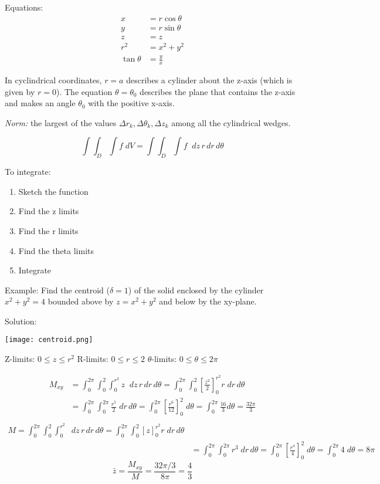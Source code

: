 \documentclass[12pt]{article}
\begin{document}
Equations:
\begin{align*}
    x &= r\cos\theta\\
    y&= r\sin \theta\\
    z &= z\\
    r^2 &= x^2 + y^2\\
    \tan \theta &= \frac{y}{x}
\end{align*}

In cyclindrical coordinates, $r=a$ describes a cylinder about the z-axis (which is given by $r=0$). The equation $\theta = \theta_0$ describes the plane that contains the z-axis and makes an angle $\theta_0$ with the positive x-axis. 

\emph{Norm:} the largest of the values $\Delta r_k, \Delta \theta_k, \Delta z_k$ among all the cylindrical wedges.

\[\int \int_D \int f \; dV = \int \int_D \int f \; \; dz \, r \, dr\, d\theta \]

To integrate:
\begin{enumerate}
    \item Sketch the function
    \item Find the z limits
    \item Find the r limits
    \item Find the theta limits
    \item Integrate
\end{enumerate}

Example: Find the centroid ($\delta = 1$) of the solid enclosed by the cylinder $x^2 + y^2 = 4$ bounded above by $z= x^2 + y^2$ and below by the xy-plane. 

Solution: 
\begin{center}
    \texttt{[image: centroid.png]}
\end{center}

Z-limits: $0 \leq z \leq r^2$
R-limits: $0 \leq r \leq 2$
$\theta$-limits: $0 \leq \theta \leq 2\pi$

\begin{align*}
    M_{xy} &= \int_0^{2\pi} \int_0^2 \int_0^{r^2} z \; \; dz \, r \, dr \, d\theta = \int_0^{2\pi} \int_0^2 \left[\frac{z^2}{2}\right]_0^{r^2} r \; dr \, d\theta\\
    &= \int_0^{2\pi} \int_0^{2\pi} \frac{r^5}{2} \; dr \, d\theta = \int_0^{2\pi} \left[\frac{r^6}{12}\right]_0^2 \; d\theta = \int_0^{2\pi} \frac{16}{3} d\theta = \frac{32\pi}{3}\\
\end{align*}
\begin{align*}
    M = \int_0^{2\pi} \int_0^2 \int_0^{r^2} \; \; dz \, r \, dr \, d\theta = \int_0^{2\pi} \int_0^2 \left[z\right]_0^{r^2} r \; dr \, d\theta\\
    &= \int_0^{2\pi} \int_0^{2\pi} r^3 \; dr \, d\theta = \int_0^{2\pi} \left[\frac{r^4}{4}\right]_0^2 \; d\theta = \int_0^{2\pi} 4 \; d\theta = 8\pi
\end{align*}
\[\bar{z} = \frac{M_{xy}}{M} = \frac{32\pi / 3}{8\pi} = \frac{4}{3}\]
\end{document}
